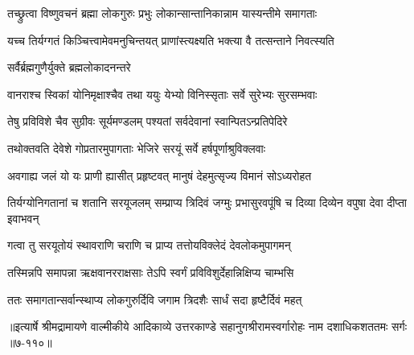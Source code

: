 \twolineshloka
{तच्छ्रुत्वा विष्णुवचनं ब्रह्मा लोकगुरुः प्रभुः}
{लोकान्सान्तानिकान्नाम यास्यन्तीमे समागताः} %

\twolineshloka
{यच्च तिर्यग्गतं किञ्चित्त्वामेवमनुचिन्तयत्}
{प्राणांस्त्यक्ष्यति भक्त्या वै तत्सन्ताने निवत्स्यति} %

\onelineshloka
{सर्वैर्ब्रह्मगुणैर्युक्ते ब्रह्मलोकादनन्तरे} %

\twolineshloka
{वानराश्च स्विकां योनिमृक्षाश्चैव तथा ययुः}
{येभ्यो विनिस्सृताः सर्वे सुरेभ्यः सुरसम्भवाः} %

\twolineshloka
{तेषु प्रविविशे चैव सुग्रीवः सूर्यमण्डलम्}
{पश्यतां सर्वदेवानां स्वान्पितऽन्प्रतिपेदिरे} %

\twolineshloka
{तथोक्तवति देवेशे गोप्रतारमुपागताः}
{भेजिरे सरयूं सर्वे हर्षपूर्णाश्रुविक्लवाः} %

\twolineshloka
{अवगाह्य जलं यो यः प्राणी ह्यासीत् प्रहृष्टवत्}
{मानुषं देहमुत्सृज्य विमानं सोऽध्यरोहत} %

\threelineshloka
{तिर्यग्योनिगतानां च शतानि सरयूजलम्}
{सम्प्राप्य त्रिदिवं जग्मुः प्रभासुरवपूंषि च}
{दिव्या दिव्येन वपुषा देवा दीप्ता इवाभवन्} %

\twolineshloka
{गत्वा तु सरयूतोयं स्थावराणि चराणि च}
{प्राप्य तत्तोयविक्लेदं देवलोकमुपागमन्} %

\twolineshloka
{तस्मिन्नपि समापन्ना ऋक्षवानरराक्षसाः}
{तेऽपि स्वर्गं प्रविविशुर्देहान्निक्षिप्य चाम्भसि} %

\twolineshloka
{ततः समागतान्सर्वान्स्थाप्य लोकगुरुर्दिवि}
{जगाम त्रिदशैः सार्धं सदा हृष्टैर्दिवं महत्} %


॥इत्यार्षे श्रीमद्रामायणे वाल्मीकीये आदिकाव्ये उत्तरकाण्डे सहानुगश्रीरामस्वर्गारोहः नाम दशाधिकशततमः सर्गः ॥७-११०॥
